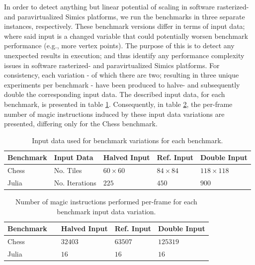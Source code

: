 In order to detect anything but linear potential of scaling in software rasterized- and paravirtualized Simics platforms,  we run the benchmarks in three separate instances, respectively.
These benchmark versions differ in terms of input data; where said input is a changed variable that could potentially worsen benchmark performance (e.g., more vertex points).
The purpose of this is to detect any unexpected results in execution; and thus identify any performance complexity issues in software rasterized- and paravirtualized Simics platforms.
For consistency, each variation - of which there are two; resulting in three unique experiments per benchmark - have been produced to halve- and subsequently double the corresponding input data.
The described input data, for each benchmark, is presented in table \ref{tab:keyvals}.
Consequently, in table \ref{tab:keyvalsmagicinstructions}, the per-frame number of magic instructions induced by these input data variations are presented, differing only for the Chess benchmark.

\begin{table}
  \centering
  \begin{tabular}{lllll}
    Benchmark & Input Data & Halved Input & Ref. Input & Double Input \\ \hline
    Chess & No. Tiles & $60\times60$ & $84\times84$ & $118\times118$ \\
    Julia & No. Iterations & $225$ & $450$ & $900$ \\
  \end{tabular}
  \caption[Input data variations]{Input data used for benchmark variations for each benchmark.}
  \label{tab:keyvals}
\end{table}

\begin{table}
  \centering
  \begin{tabular}{lllll}
    Benchmark & \phantom{Input Data} & Halved Input & Ref. Input & Double Input \\ \hline
    Chess & \phantom{No. Tiles} & $32403$ & $63507$ & $125319$ \\
    Julia & \phantom{No. Iterations} & $16$ & $16$ & $16$ \\
  \end{tabular}
  \caption[Input data variation magic instruction count]{Number of magic instructions performed per-frame for each benchmark input data variation.}
  \label{tab:keyvalsmagicinstructions}
\end{table}

